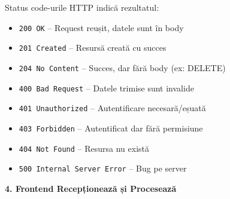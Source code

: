 Status code-urile HTTP indică rezultatul:
\begin{itemize}
  \item \texttt{200 OK} – Request reușit, datele sunt în body
  \item \texttt{201 Created} – Resursă creată cu succes
  \item \texttt{204 No Content} – Succes, dar fără body (ex: DELETE)
  \item \texttt{400 Bad Request} – Datele trimise sunt invalide
  \item \texttt{401 Unauthorized} – Autentificare necesară/eșuată
  \item \texttt{403 Forbidden} – Autentificat dar fără permisiune
  \item \texttt{404 Not Found} – Resursa nu există
  \item \texttt{500 Internal Server Error} – Bug pe server
\end{itemize}

\textbf{4. Frontend Recepționează și Procesează}

